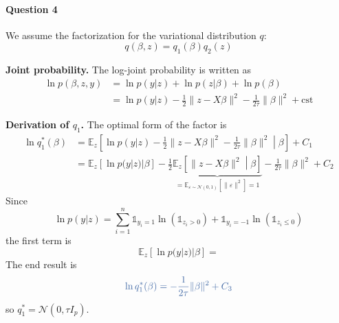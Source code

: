 \documentclass[11pt]{article}
\newcommand\EE{\mathbb{E}}
\renewcommand{\epsilon}{\varepsilon}
\newcommand{\calN}{\mathcal{N}}
\newcommand{\bluefont}{\color{darkblue}}
\begin{document}
\paragraph{Question 4}
We assume the factorization for the variational distribution $q$:
\begin{equation}
	q(\beta, z) = q_1(\beta)q_2(z)
\end{equation}

\textbf{Joint probability.} The log-joint probability is written as
\begin{equation}
\begin{aligned}
	\ln p(\beta, z, y)
	&= \ln p(y | z) + \ln p(z|\beta) + \ln p(\beta)  \\
	&= \ln p(y|z) - \frac{1}{2}\|z-X\beta\|^2 - \frac{1}{2\tau} \|\beta\|^2 + \mathrm{cst}
\end{aligned}
\end{equation}

\textbf{Derivation of \boldmath$q_1$.} The optimal form of the factor is
\begin{equation}
\begin{aligned}
	\ln q_1^*(\beta) &= \EE_{z}\left[
		\ln p(y|z) - \frac{1}{2}\|z-X\beta\|^2 - \frac{1}{2\tau} \|\beta\|^2
		\middle| \beta
	\right] + C_1  \\
	&= \EE_z [\ln p(y|z) | \beta]
	- \frac{1}{2} \underbrace{\EE_z\left[\|z-X\beta\|^2 \middle| \beta\right]}_{=\EE_{\epsilon\sim\calN(0,1)}[\|\epsilon\|^2] = 1}
	- \frac{1}{2\tau}\|\beta\|^2
	+ C_2
\end{aligned}
\end{equation}
Since
\[
	\ln p(y|z) = \sum_{i=1}^n \mathds{1}_{y_i=1}\ln(\mathds{1}_{z_i>0}) + \mathds{1}_{y_i=-1}\ln(\mathds{1}_{z_i\leq 0})
\]
the first term is
\[
	\EE_z[\ln p(y|z) | \beta] =
\]
The end result is
\begin{equation}
\bluefont
	\ln q^*_1(\beta) = -\frac{1}{2\tau}\|\beta\|^2 + C_3
\end{equation}
so $\boxed{q^*_1 = \calN(0, \tau I_p).}$
\end{document}
